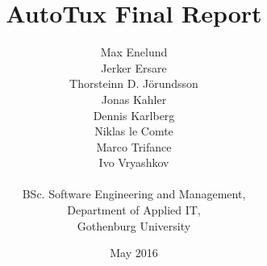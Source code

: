 \title{AutoTux Final Report}
\author{Max Enelund \\ Jerker Ersare \\
        Thorsteinn D. J{\"o}rundsson \\ Jonas Kahler \\
        Dennis Karlberg \\ Niklas le Comte \\
        Marco Trifance \\ Ivo Vryashkov \\ \\
        BSc. Software Engineering and Management, \\
        Department of Applied IT, \\ Gothenburg University}
\date{May 2016}
\maketitle
